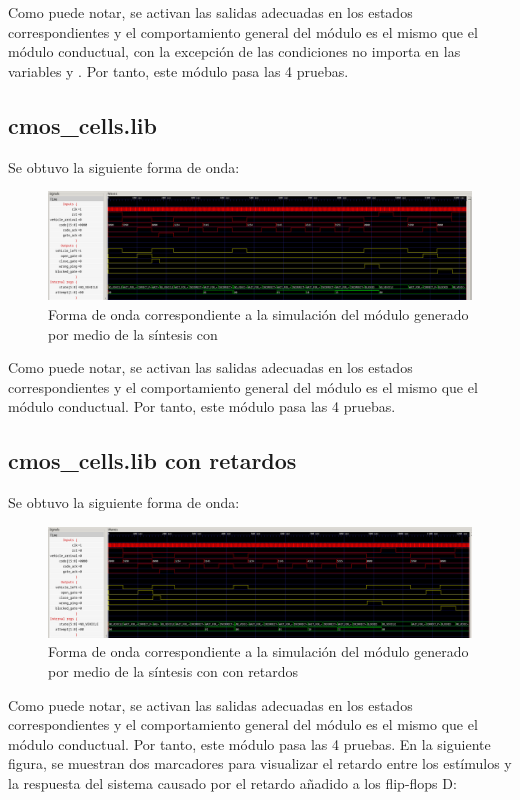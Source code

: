 Como puede notar, se activan las salidas adecuadas en los estados correspondientes y el comportamiento general del módulo es el mismo que el módulo conductual, con la excepción de las condiciones no importa en las variables  y . Por tanto, este módulo pasa las 4 pruebas.

\subsection{cmos\_cells.lib}
Se obtuvo la siguiente forma de onda:
\begin{figure}[!h]
    \centering
    \includegraphics[width = \linewidth]{figs/cmoscells.png}
    \caption{Forma de onda correspondiente a la simulación del módulo generado por medio de la síntesis con }
    \label{fig1111}
\end{figure}

Como puede notar, se activan las salidas adecuadas en los estados correspondientes y el comportamiento general del módulo es el mismo que el módulo conductual. Por tanto, este módulo pasa las 4 pruebas.
\newpage

\subsection{cmos\_cells.lib con retardos}
Se obtuvo la siguiente forma de onda:
\begin{figure}[!h]
    \centering
    \includegraphics[width = \linewidth]{figs/cmoscellsdelay.png}
    \caption{Forma de onda correspondiente a la simulación del módulo generado por medio de la síntesis con  con retardos}
    \label{fig111}
\end{figure}

Como puede notar, se activan las salidas adecuadas en los estados correspondientes y el comportamiento general del módulo es el mismo que el módulo conductual. Por tanto, este módulo pasa las 4 pruebas. En la siguiente figura, se muestran dos marcadores para visualizar el retardo entre los estímulos y la respuesta del sistema causado por el retardo añadido a los flip-flops D:

